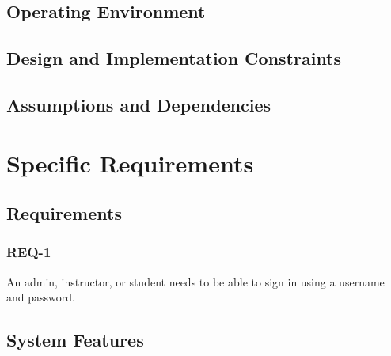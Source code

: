 \documentclass{article}
\begin{document}
\subsection{Operating Environment}

\subsection{Design and Implementation Constraints}

\subsection{Assumptions and Dependencies}

\section{Specific Requirements}

\subsection{Requirements}

\subsubsection{REQ-1}

An admin, instructor, or student needs to be able to sign in using a username and password.

\subsection{System Features}




\end{document}
